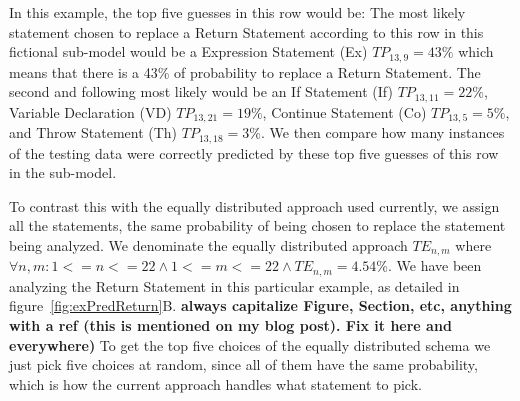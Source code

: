 \documentclass[conference]{IEEEtran}
\newcommand{\todo}[1]
  {{\scriptsize \textbf{\color{red} {#1}}}}
\begin{document}
In this example, the top five guesses in this row would be: The most 
likely statement chosen to replace a Return Statement according to this row in 
this fictional sub-model would be a Expression Statement (Ex) $TP_{13,9} = 43\%$ 
which means that there is a 43\% of probability to replace a Return Statement. 
The second and following most likely would be an If Statement (If) $TP_{13,11} = 22\%$, Variable Declaration (VD)  $TP_{13,21} = 19\%$, 
Continue Statement (Co)  $TP_{13,5} = 5\%$, and Throw Statement (Th) $TP_{13,18} = 3\%$. We then compare how many instances of the testing data were correctly predicted 
by these top five guesses of this row in the sub-model. 


To contrast this with the equally distributed approach used currently, 
we assign all the statements, the same probability of being chosen to replace 
the statement being analyzed. We denominate the equally distributed approach 
$TE_{n,m}$ where $\forall n,m: 1<=n<=22 \land 1<=m<=22 \land TE_{n,m} = 4.54\%$. 
We have been analyzing the Return Statement in this particular example, as 
detailed in figure~\ref{fig:exPredReturn}B.\todo{always capitalize Figure,
  Section, etc, anything with a ref (this is mentioned on my blog post).  Fix it
  here and everywhere)} To get the top five choices of the 
equally distributed schema we just pick five choices at random, since all of 
them have the same probability, which is how the current approach handles what 
statement to pick.
\end{document}
